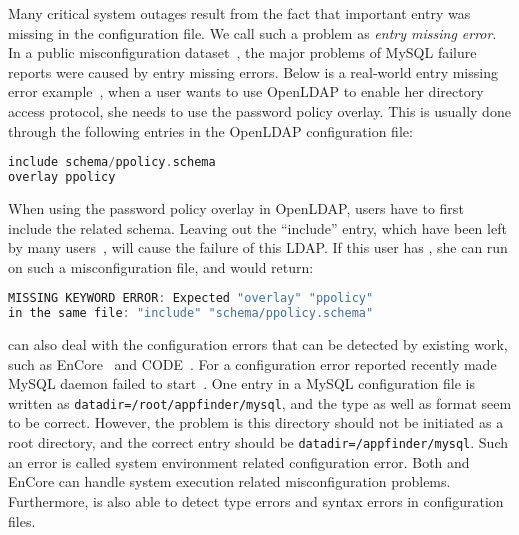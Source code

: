 Many critical system outages result from the fact that important
entry was missing in the configuration file. 
We call such a problem as {\em entry missing error}.
In a public misconfiguration dataset~\cite{configdataset},
the major problems of MySQL failure reports were caused by
entry missing errors.
Below is a real-world entry missing error example~\cite{yin11anempirical},
when a user wants to use OpenLDAP to enable her directory access
protocol, she needs to use the password policy overlay. This is usually
done through the following entries in the OpenLDAP configuration file:

\begin{lstlisting}[language=C, xleftmargin=.01\textwidth]
include schema/ppolicy.schema
overlay ppolicy
\end{lstlisting} 

When using the password policy overlay in OpenLDAP, 
users have to first include the related schema.
Leaving out the ``include'' entry, 
which have been left by many users~\cite{yin11anempirical}, 
will cause the failure of this LDAP. 
If this user has \app, she can run \app on such a misconfiguration file,
and \app would return:

\begin{lstlisting}[language=C, xleftmargin=.01\textwidth]
MISSING KEYWORD ERROR: Expected "overlay" "ppolicy"
in the same file: "include" "schema/ppolicy.schema"
\end{lstlisting} 


\app can also deal with the configuration errors that can be detected by
existing work, such as EnCore~\cite{zhang14encore} and
CODE~\cite{yuan11context}.
For a configuration error reported recently made MySQL
daemon failed to start~\cite{syserror}.
One entry in a MySQL configuration file is written as 
{\tt datadir=/root/appfinder/mysql}, and the type as well as 
format seem to be correct.
However, the problem is this directory should not be
initiated as a root directory, and the correct entry
should be {\tt datadir=/appfinder/mysql}.
Such an error is called system environment related configuration error.
Both \app and EnCore can handle system execution related
misconfiguration problems.
Furthermore, \app is also able to detect type errors and syntax errors
in configuration files.
